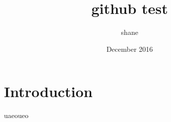 \documentclass{article}
\title{github test}
\author{shane }
\date{December 2016}
\begin{document}
\maketitle

\section{Introduction}

uaeoueo
\end{document}
